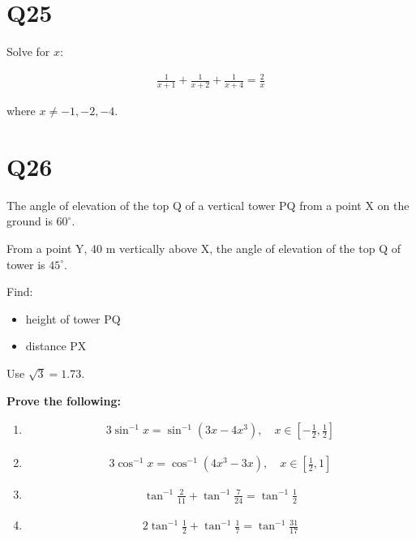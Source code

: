 \documentclass[12pt]{article}
\begin{document}
\section*{Q25}

Solve for $x$:

\begin{align*}
\frac{1}{x+1}
+
\frac{1}{x+2}
+
\frac{1}{x+4}
=
\frac{2}{x}
\end{align*}

where $x \neq -1,-2,-4$.

\section*{Q26}

The angle of elevation of the top Q of a vertical tower PQ from a point X on the ground is $60^\circ$.

From a point Y, 40 m vertically above X, the angle of elevation of the top Q of tower is $45^\circ$.

Find:

\begin{itemize}

\item height of tower PQ

\item distance PX

\end{itemize}

Use $\sqrt{3}=1.73$.

\vspace{0.7cm}

\textbf{Prove the following:}

\begin{enumerate}

\item

\begin{align*}
3\sin^{-1}x
=
\sin^{-1}(3x-4x^3),
\quad
x \in \left[-\frac{1}{2},\frac{1}{2}\right]
\end{align*}

\item

\begin{align*}
3\cos^{-1}x
=
\cos^{-1}(4x^3-3x),
\quad
x \in \left[\frac{1}{2},1\right]
\end{align*}

\item

\begin{align*}
\tan^{-1}\frac{2}{11}
+
\tan^{-1}\frac{7}{24}
=
\tan^{-1}\frac{1}{2}
\end{align*}

\item

\begin{align*}
2\tan^{-1}\frac{1}{2}
+
\tan^{-1}\frac{1}{7}
=
\tan^{-1}\frac{31}{17}
\end{align*}

\end{enumerate}
\end{document}
